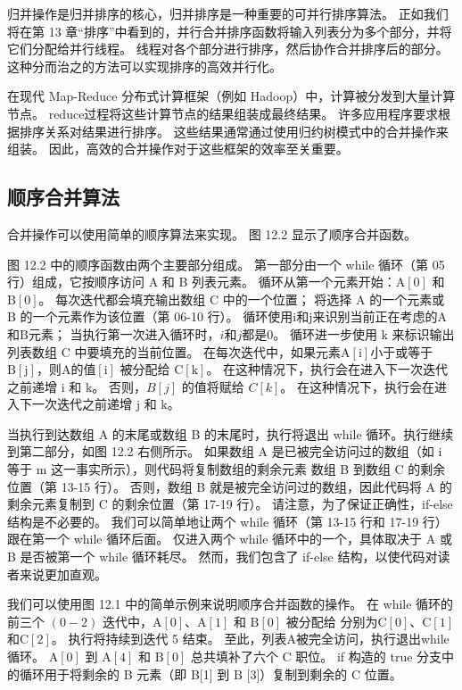 归并操作是归并排序的核心，归并排序是一种重要的可并行排序算法。 正如我们将在第 13 章“排序”中看到的，并行合并排序函数将输入列表分为多个部分，并将它们分配给并行线程。 线程对各个部分进行排序，然后协作合并排序后的部分。 这种分而治之的方法可以实现排序的高效并行化。

在现代 Map-Reduce 分布式计算框架（例如 Hadoop）中，计算被分发到大量计算节点。 reduce过程将这些计算节点的结果组装成最终结果。 许多应用程序要求根据排序关系对结果进行排序。 这些结果通常通过使用归约树模式中的合并操作来组装。 因此，高效的合并操作对于这些框架的效率至关重要。

\subsection{顺序合并算法}
合并操作可以使用简单的顺序算法来实现。 图 12.2 显示了顺序合并函数。

图 12.2 中的顺序函数由两个主要部分组成。 第一部分由一个 while 循环（第 05 行）组成，它按顺序访问 A 和 B 列表元素。 循环从第一个元素开始：$\mathrm{A}[0]$ 和 $\mathrm{B}[0]$。 每次迭代都会填充输出数组 C 中的一个位置； 将选择 A 的一个元素或 B 的一个元素作为该位置（第 06-10 行）。 循环使用$\mathrm{i}$和$\mathrm{j}$来识别当前正在考虑的A和$\mathrm{B}$元素； 当执行第一次进入循环时，$i$和$j$都是0。 循环进一步使用 $\mathrm{k}$ 来标识输出列表数组 $\mathrm{C}$ 中要填充的当前位置。 在每次迭代中，如果元素$\mathrm{A}[\mathrm{i}]$小于或等于$\mathrm{B}[\mathrm{j}]$，则$\mathrm{A}的值 [\mathrm{i}]$ 被分配给 $\mathrm{C}[\mathrm{k}]$。 在这种情况下，执行会在进入下一次迭代之前递增 $\mathrm{i}$ 和 $\mathrm{k}$。 否则，$B[j]$ 的值将赋给 $C[k]$。 在这种情况下，执行会在进入下一次迭代之前递增 $\mathrm{j}$ 和 $\mathrm{k}$。

当执行到达数组 A 的末尾或数组 B 的末尾时，执行将退出 while 循环。执行继续到第二部分，如图 12.2 右侧所示。 如果数组 $\mathrm{A}$ 是已被完全访问过的数组（如 $\mathrm{i}$ 等于 $\mathrm{m}$ 这一事实所示），则代码将复制数组的剩余元素 数组 B 到数组 C 的剩余位置（第 13-15 行）。 否则，数组 B 就是被完全访问过的数组，因此代码将 A 的剩余元素复制到 C 的剩余位置（第 17-19 行）。 请注意，为了保证正确性，if-else 结构是不必要的。 我们可以简单地让两个 while 循环（第 13-15 行和 17-19 行）跟在第一个 while 循环后面。 仅进入两个 while 循环中的一个，具体取决于 A 或 B 是否被第一个 while 循环耗尽。 然而，我们包含了 if-else 结构，以使代码对读者来说更加直观。

我们可以使用图 12.1 中的简单示例来说明顺序合并函数的操作。 在 while 循环的前三个 $(0-2)$ 迭代中，$\mathrm{A}[0]、\mathrm{A}[1]$ 和 $\mathrm{B}[0]$ 被分配给 分别为$\mathrm{C}[0]、\mathrm{C}[1]$和$\mathrm{C}[2]$。 执行将持续到迭代 5 结束。 至此，列表$\mathrm{A}$被完全访问，执行退出while循环。 $\mathrm{A}[0]$ 到 $\mathrm{A}[4]$ 和 $\mathrm{B}[0]$ 总共填补了六个 $\mathrm{C}$ 职位。 if 构造的 true 分支中的循环用于将剩余的 B 元素（即 B[1] 到 $\mathrm{B}$ [3]）复制到剩余的 $\mathrm{C}$ 位置。

